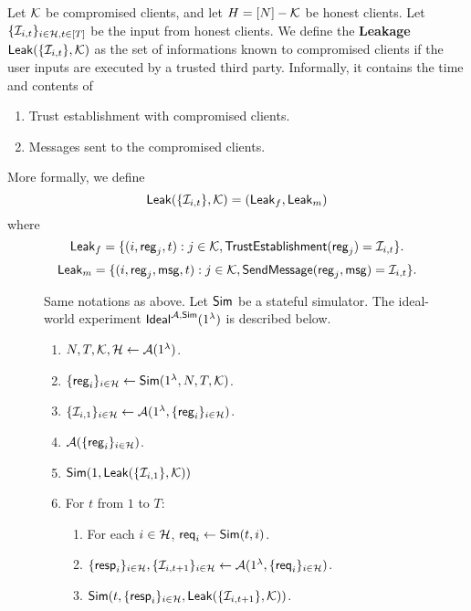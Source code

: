 \begin{definition}[Leakage]
Let $\mathcal{K}$ be compromised clients, and let $H = [N] - \mathcal{K}$ be honest clients. Let $\{\mathcal{I}_{i, t}\}_{i \in \mathcal{H}, t \in [T]}$ be the input from honest clients. We define the \textbf{Leakage} $\mathsf{Leak}(\{\mathcal{I}_{i, t}\}, \mathcal{K})$ as the set of informations known to compromised clients if the user inputs are executed by a trusted third party. Informally, it contains the time and contents of
\begin{enumerate}
    \item Trust establishment with compromised clients.
    \item Messages sent to the compromised clients.
\end{enumerate}
More formally, we define
$$\mathsf{Leak}(\{\mathcal{I}_{i, t}\}, \mathcal{K}) = (\mathsf{Leak}_f, \mathsf{Leak}_m)$$
where
$$\mathsf{Leak}_f = \{(i, \mathsf{reg}_j, t): j \in \mathcal{K}, \mathsf{TrustEstablishment}(\mathsf{reg}_j) = \mathcal{I}_{i, t}\}.$$
$$\mathsf{Leak}_m = \{(i, \mathsf{reg}_j, \mathsf{msg}, t): j \in \mathcal{K}, \mathsf{SendMessage}(\mathsf{reg}_j, \mathsf{msg}) = \mathcal{I}_{i, t}\}.$$
\end{definition}
\begin{figure}[h!]
\begin{framed}
\begin{definition}
Same notations as above. Let $\mathsf{Sim}$ be a stateful simulator. The ideal-world experiment $\mathsf{Ideal}^{\mathcal{A}, \mathsf{Sim}}(1^{\lambda})$ is described below.
\begin{enumerate}
\item $N, T, \mathcal{K}, \mathcal{H} \leftarrow \mathcal{A}(1^{\lambda})$.
\item $\{\mathsf{reg}_i\}_{i \in \mathcal{H}} \leftarrow \mathsf{Sim}(1^{\lambda}, N, T, \mathcal{K})$. 
\item $\{\mathcal{I}_{i, 1}\}_{i \in \mathcal{H}} \leftarrow \mathcal{A}(1^{\lambda}, \{\mathsf{reg}_i\}_{i \in \mathcal{H}})$.
\item $\mathcal{A}(\{\mathsf{reg}_i\}_{i \in \mathcal{H}})$.
\item $\mathsf{Sim}(1, \mathsf{Leak}(\{\mathcal{I}_{i, 1}\}, \mathcal{K}))$
\item For $t$ from $1$ to $T$:
    \begin{enumerate}
    \item For each $i \in \mathcal{H}$, $\mathsf{req}_i \leftarrow \mathsf{Sim}(t, i)$.
    
    \item $\{\mathsf{resp}_i\}_{i \in \mathcal{H}}, \{\mathcal{I}_{i, t + 1}\}_{i \in \mathcal{H}} \leftarrow \mathcal{A}(1^{\lambda}, \{\mathsf{req}_i\}_{i \in \mathcal{H}})$.
    
    \item $\mathsf{Sim}(t, \{\mathsf{resp}_i\}_{i \in \mathcal{H}}, \mathsf{Leak}(\{\mathcal{I}_{i, t + 1}\}, \mathcal{K}))$.
    \end{enumerate}
\end{enumerate}
\end{definition}
\end{framed}
\end{figure}
